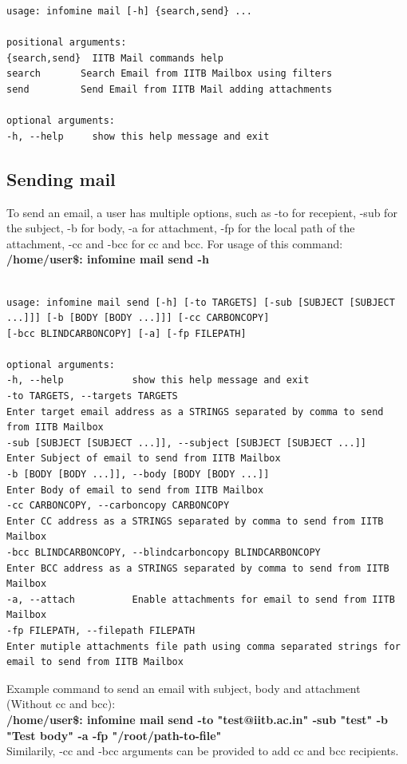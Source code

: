 \documentclass[12pt, letterpaper, twoside]{article}
\begin{document}
\begin{verbatim}
usage: infomine mail [-h] {search,send} ...

positional arguments:
{search,send}  IITB Mail commands help
search       Search Email from IITB Mailbox using filters
send         Send Email from IITB Mail adding attachments

optional arguments:
-h, --help     show this help message and exit
\end{verbatim}

\subsection{Sending mail}
To send an email, a user has multiple options, such as -to for recepient, -sub for the subject, -b for body, -a for attachment, -fp for the local path of the attachment, -cc and -bcc for cc and bcc. For usage of this command: \\
\textbf{/home/user\$: infomine mail send -h}\\
\\
\begin{verbatim}
usage: infomine mail send [-h] [-to TARGETS] [-sub [SUBJECT [SUBJECT ...]]] [-b [BODY [BODY ...]]] [-cc CARBONCOPY]
[-bcc BLINDCARBONCOPY] [-a] [-fp FILEPATH]

optional arguments:
-h, --help            show this help message and exit
-to TARGETS, --targets TARGETS
Enter target email address as a STRINGS separated by comma to send from IITB Mailbox
-sub [SUBJECT [SUBJECT ...]], --subject [SUBJECT [SUBJECT ...]]
Enter Subject of email to send from IITB Mailbox
-b [BODY [BODY ...]], --body [BODY [BODY ...]]
Enter Body of email to send from IITB Mailbox
-cc CARBONCOPY, --carboncopy CARBONCOPY
Enter CC address as a STRINGS separated by comma to send from IITB Mailbox
-bcc BLINDCARBONCOPY, --blindcarboncopy BLINDCARBONCOPY
Enter BCC address as a STRINGS separated by comma to send from IITB Mailbox
-a, --attach          Enable attachments for email to send from IITB Mailbox
-fp FILEPATH, --filepath FILEPATH
Enter mutiple attachments file path using comma separated strings for email to send from IITB Mailbox
\end{verbatim}
Example command to send an email with subject, body and attachment (Without cc and bcc):\\
\textbf{/home/user\$: infomine mail send -to "test@iitb.ac.in" -sub "test" -b "Test body" -a -fp "/root/path-to-file"}\\
Similarily, -cc and -bcc arguments can be provided to add cc and bcc recipients.
\end{document}
